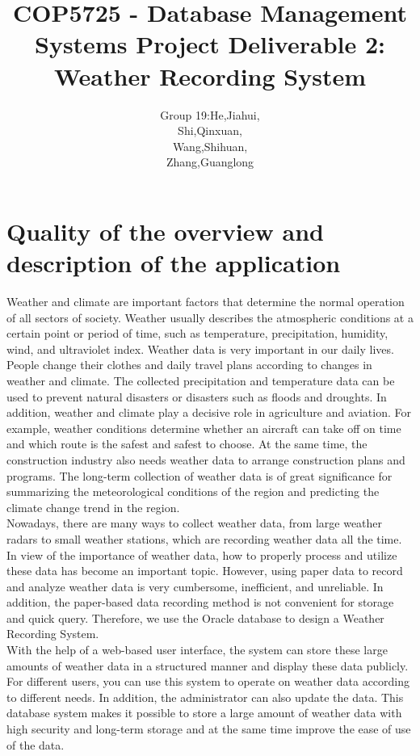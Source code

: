 \documentclass[]{article}
\title{\Huge COP5725 - Database Management Systems\vspace{2.8em} \LARGE \textbf{Project Deliverable 2:} Weather Recording System}
\author{
	\Large Group 19:\qquad He,Jiahui,\\
	\Large \qquad\qquad\qquad\qquad Shi,Qinxuan,\\
	\Large \qquad\qquad\qquad\qquad Wang,Shihuan,\\
	\Large \qquad\qquad\qquad\qquad\qquad Zhang,Guanglong
}
\date{}
\begin{document}
	
	\maketitle
	\clearpage
	
	\tableofcontents
	\clearpage
	
	\section{Quality of the overview and description of the application}
	
	Weather and climate are important factors that determine the normal operation of all sectors of society. Weather usually describes the atmospheric conditions at a certain point or period of time, such as temperature, precipitation, humidity, wind, and ultraviolet index. Weather data is very important in our daily lives. People change their clothes and daily travel plans according to changes in weather and climate. The collected precipitation and temperature data can be used to prevent natural disasters or disasters such as floods and droughts. In addition, weather and climate play a decisive role in agriculture and aviation. For example, weather conditions determine whether an aircraft can take off on time and which route is the safest and safest to choose. At the same time, the construction industry also needs weather data to arrange construction plans and programs. The long-term collection of weather data is of great significance for summarizing the meteorological conditions of the region and predicting the climate change trend in the region. \\
	
	\noindent Nowadays, there are many ways to collect weather data, from large weather radars to small weather stations, which are recording weather data all the time. In view of the importance of weather data, how to properly process and utilize these data has become an important topic. However, using paper data to record and analyze weather data is very cumbersome, inefficient, and unreliable. In addition, the paper-based data recording method is not convenient for storage and quick query. Therefore, we use the Oracle database to design a Weather Recording System. \\
	
	\noindent With the help of a web-based user interface, the system can store these large amounts of weather data in a structured manner and display these data publicly. For different users, you can use this system to operate on weather data according to different needs. In addition, the administrator can also update the data. This database system makes it possible to store a large amount of weather data with high security and long-term storage and at the same time improve the ease of use of the data. \\
	
\end{document}
